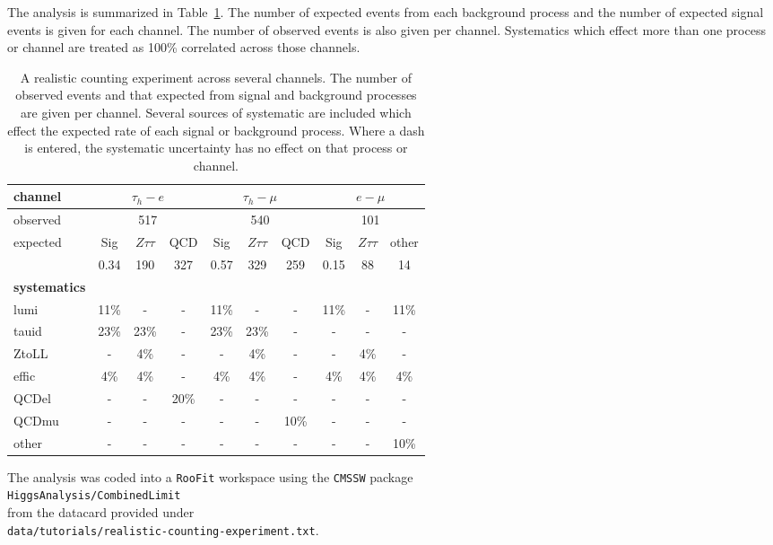 The analysis is summarized in Table~\ref{tab:realanalysis}. The number of expected events from each background process and the number of
expected signal events is given for each channel. The number of observed events is also given per channel. Systematics which effect
more than one process or channel are treated as 100\% correlated across those channels.

\begin{table}
\centering
\begin{tabular}{|l|c|c|c|c|c|c|c|c|c|}
\hline
\textbf{channel} & \multicolumn{3}{c|}{$\tau_{h}-e$} & \multicolumn{3}{|c|}{$\tau_{h}-\mu$} &\multicolumn{3}{c|}{$e-\mu$}   	\\ \hline
observed & \multicolumn{3}{c}{517} &\multicolumn{3}{|c|}{540} & \multicolumn{3}{c|}{101} 				\\ \hline
expected & Sig & $Z\tau\tau$ & QCD & Sig & $Z\tau\tau$ & QCD &Sig & $Z\tau\tau$ & other 				\\ \hline
	 & 0.34 & 190 & 327 &  0.57 & 329 & 259 & 0.15 & 88 & 14							\\ \hline
\hline
\textbf{systematics} & \multicolumn{9}{c|}{} \\ \hline
lumi	 & 11\% & - & - & 11\% & - & - & 11\% & - & 11\% 	\\ \hline 
tauid	 & 23\% & 23\% & - & 23\% & 23\% & - & - & - & -  	\\ \hline 
ZtoLL    & - & 4\% & - & - & 4\% & - & - & 4\% & - 		\\ \hline
effic    & 4\% & 4\%&  - & 4\% & 4\% & - & 4\% & 4\% & 4\%	\\ \hline  
QCDel	 & - & - & 20\% & - & - & - & - & - & - 		\\ \hline
QCDmu    & - & - & - & - & - & 10\% & - & - & -			\\ \hline
other    & - & - & - & - & - & - & - & - & 10\%			\\ \hline
\end{tabular}
\caption{A realistic counting experiment across several channels. The number of observed events and that expected from signal and background
processes are given per channel. Several sources of systematic are included which effect the expected rate of each signal or background process. 
Where a dash is entered, the systematic uncertainty has no effect on that process or channel. \label{tab:realanalysis}}
\end{table}

The analysis was coded into a \texttt{RooFit} workspace using the \texttt{CMSSW} package \\
\texttt{HiggsAnalysis/CombinedLimit}\\
from the datacard provided under \\ \texttt{data/tutorials/realistic-counting-experiment.txt}.


